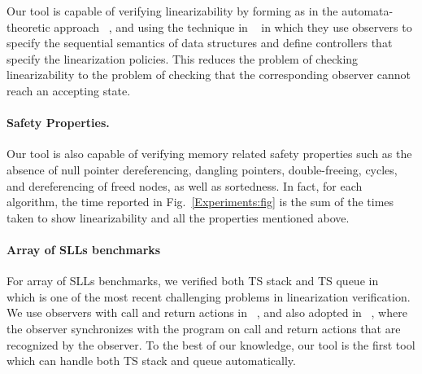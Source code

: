 Our tool is capable of verifying linearizability by forming  as in the automata-theoretic approach ~\cite{VW:modelchecking}, and using the technique in ~\cite{Quy:sas16} in which they use observers to specify the sequential semantics of data structures and define controllers that specify the linearization policies. This reduces the problem of checking linearizability to the problem of checking that the corresponding observer cannot reach an accepting state.
\paragraph{Safety Properties.}
Our tool is also capable of verifying memory related safety properties such as the absence of null pointer dereferencing,  dangling pointers,  double-freeing, cycles, and dereferencing of freed nodes, as well as sortedness. In fact, for each algorithm, the time reported in Fig.~\ref{Experiments:fig} is the sum of the 
times taken to show linearizability and all the properties mentioned above.

\paragraph{Array of SLLs benchmarks} For array of SLLs benchmarks, we verified both TS stack and TS queue in ~\cite{ts-stack} which is one of the most recent challenging problems in linearization verification. We use observers with call and return actions in ~\cite{BEEH:icalp15}, and also adopted in ~\cite{Quy:sas16}, where the observer synchronizes with the program on call and return actions that are recognized by the observer. To the best of our knowledge, our tool is the first tool which can handle both TS stack and queue automatically.
